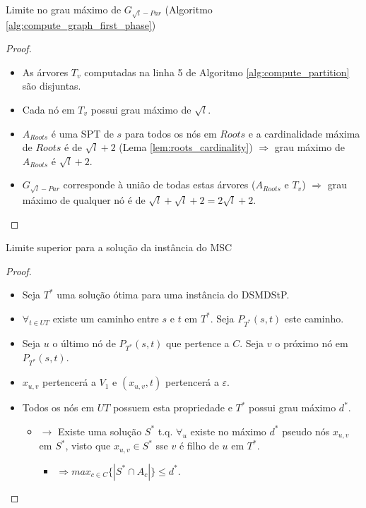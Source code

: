 \documentclass[10pt]{beamer}
\begin{document}
\begin{frame}{Limite no grau máximo de $G_{\sqrt{l}-Par}$ (Algoritmo \ref{alg:compute_graph_first_phase}) \hyperlink{roots_size}{}}
\hypertarget{roots_size_slide}{}
  \begin{proof}%
    \begin{itemize}
      \item <1-> As árvores $T_v$ computadas na linha 5 de Algoritmo \ref{alg:compute_partition} são disjuntas. 
      \item <2-> Cada nó em $T_v$ possui grau máximo de $\sqrt{l}$.
      \item <3-> $A_{Roots}$ é uma SPT de $s$ para todos os nós em $Roots$ e a cardinalidade máxima de $Roots$ é de $\sqrt{l} + 2$ (Lema \ref{lem:roots_cardinality}) $\Rightarrow$ 
grau máximo de $A_{Roots}$ é $\sqrt{l} + 2$.
      \item <4-> $G_{\sqrt{l}-Par}$ corresponde à união de todas estas árvores ($A_{Roots}$ e $T_v$) $\Longrightarrow$ grau máximo de qualquer nó é de $\sqrt{l} + \sqrt{l} + 2 = 2\sqrt{l} + 2$.
    \end{itemize}
  \end{proof}
\end{frame}

\begin{frame}{Limite superior para a solução da instância do MSC \hyperlink{val_solution}{}}
\hypertarget{val_solution_slide}{}
  \begin{proof}%
    \begin{itemize}
      \item <1-> Seja $T^*$ uma solução ótima para uma instância do DSMDStP. 
      \item <2-> $\forall_{t \in UT}$ existe um caminho entre $s$ e $t$ em $T^*$. Seja $P_{T^*}(s,t)$ este caminho.
      \item <3-> Seja $u$ o último nó de $P_{T^*}(s,t)$ que pertence a $C$. Seja $v$ o próximo nó em $P_{T^*}(s,t)$.
      \item <4-> $x_{u, v}$ pertencerá a $V_1$ e $(x_{u, v}, t)$ pertencerá a $\varepsilon$.
      \item <5-> Todos os nós em $UT$ possuem esta propriedade e $T^*$ possui grau máximo $d^*$.
      \begin{itemize}
	\item $\rightarrow$ Existe uma solução $S^*$ t.q. $\forall_{u}$ existe no máximo $d^*$ pseudo nós $x_{u,v}$ em $S^*$, visto que $x_{u,v} \in S^*$ sse $v$ é filho de $u$ em $T^*$.
	\begin{itemize}
	  \item $\Rightarrow max_{c \in C}\{|S^* \cap A_c|\}\le d^*$.
	\end{itemize}
      \end{itemize}
    \end{itemize}
  \end{proof}
\end{frame}
\end{document}
